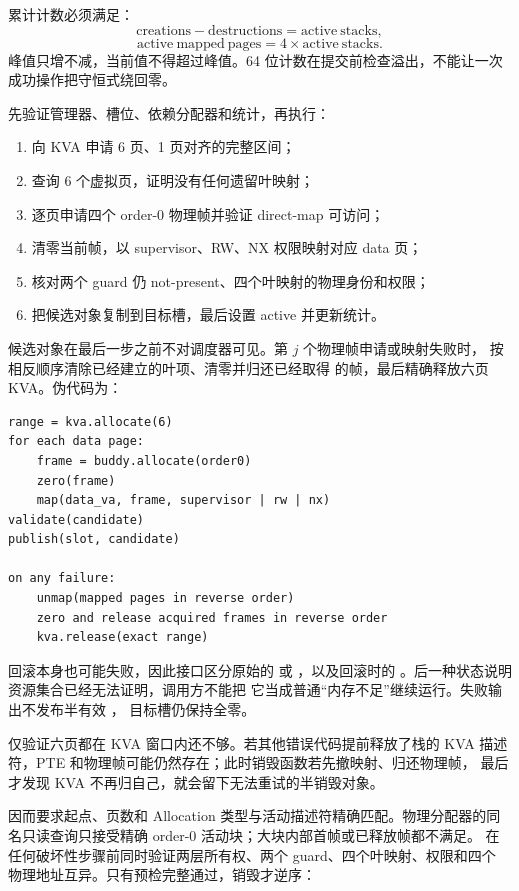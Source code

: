 累计计数必须满足：
\[
  \mathrm{creations}-\mathrm{destructions}
  =\mathrm{active\ stacks},
\]
\[
  \mathrm{active\ mapped\ pages}=4\times\mathrm{active\ stacks}.
\]
峰值只增不减，当前值不得超过峰值。64 位计数在提交前检查溢出，不能让一次
成功操作把守恒式绕回零。

 先验证管理器、槽位、依赖分配器和统计，再执行：

\begin{enumerate}[label=\arabic*.]
  \item 向 KVA 申请 6 页、1 页对齐的完整区间；
  \item 查询 6 个虚拟页，证明没有任何遗留叶映射；
  \item 逐页申请四个 order-0 物理帧并验证 direct-map 可访问；
  \item 清零当前帧，以 supervisor、RW、NX 权限映射对应 data 页；
  \item 核对两个 guard 仍 not-present、四个叶映射的物理身份和权限；
  \item 把候选对象复制到目标槽，最后设置 active 并更新统计。
\end{enumerate}

候选对象在最后一步之前不对调度器可见。第 \(j\) 个物理帧申请或映射失败时，
 按相反顺序清除已经建立的叶项、清零并归还已经取得
的帧，最后精确释放六页 KVA。伪代码为：

\begin{verbatim}
range = kva.allocate(6)
for each data page:
    frame = buddy.allocate(order0)
    zero(frame)
    map(data_va, frame, supervisor | rw | nx)
validate(candidate)
publish(slot, candidate)

on any failure:
    unmap(mapped pages in reverse order)
    zero and release acquired frames in reverse order
    kva.release(exact range)
\end{verbatim}

回滚本身也可能失败，因此接口区分原始的
 或 ，以及回滚时的
。后一种状态说明资源集合已经无法证明，调用方不能把
它当成普通“内存不足”继续运行。失败输出不发布半有效 ，
目标槽仍保持全零。

仅验证六页都在 KVA 窗口内还不够。若其他错误代码提前释放了栈的 KVA
描述符，PTE 和物理帧可能仍然存在；此时销毁函数若先撤映射、归还物理帧，
最后才发现 KVA 不再归自己，就会留下无法重试的半销毁对象。

 因而要求起点、页数和
Allocation 类型与活动描述符精确匹配。物理分配器的同名只读查询只接受精确
order-0 活动块；大块内部首帧或已释放帧都不满足。 在
任何破坏性步骤前同时验证两层所有权、两个 guard、四个叶映射、权限和四个
物理地址互异。只有预检完整通过，销毁才逆序：

